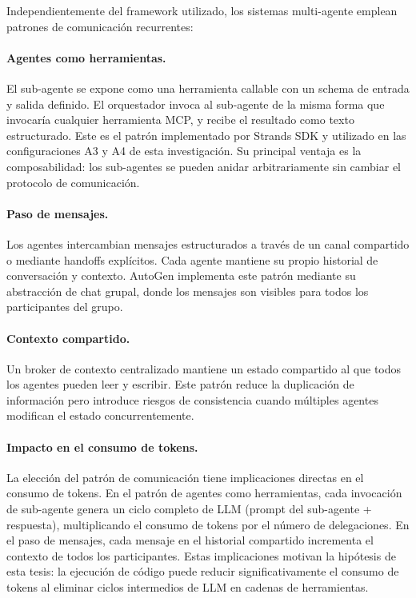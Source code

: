 Independientemente del framework utilizado, los sistemas multi-agente emplean
patrones de comunicación recurrentes:

\paragraph{Agentes como herramientas.} El sub-agente se expone como una
herramienta callable con un schema de entrada y salida definido. El
orquestador invoca al sub-agente de la misma forma que invocaría cualquier
herramienta MCP, y recibe el resultado como texto estructurado. Este es el
patrón implementado por Strands SDK y utilizado en las configuraciones A3 y A4
de esta investigación. Su principal ventaja es la composabilidad: los
sub-agentes se pueden anidar arbitrariamente sin cambiar el protocolo de
comunicación.

\paragraph{Paso de mensajes.} Los agentes intercambian mensajes estructurados
a través de un canal compartido o mediante handoffs explícitos. Cada agente
mantiene su propio historial de conversación y contexto. AutoGen implementa
este patrón mediante su abstracción de chat grupal, donde los mensajes son
visibles para todos los participantes del grupo.

\paragraph{Contexto compartido.} Un broker de contexto centralizado mantiene
un estado compartido al que todos los agentes pueden leer y escribir. Este
patrón reduce la duplicación de información pero introduce riesgos de
consistencia cuando múltiples agentes modifican el estado concurrentemente.

\paragraph{Impacto en el consumo de tokens.} La elección del patrón de
comunicación tiene implicaciones directas en el consumo de tokens. En el patrón
de agentes como herramientas, cada invocación de sub-agente genera un ciclo
completo de LLM (prompt del sub-agente + respuesta), multiplicando el consumo
de tokens por el número de delegaciones. En el paso de mensajes, cada mensaje
en el historial compartido incrementa el contexto de todos los participantes.
Estas implicaciones motivan la hipótesis de esta tesis: la ejecución de código
puede reducir significativamente el consumo de tokens al eliminar ciclos
intermedios de LLM en cadenas de herramientas.
